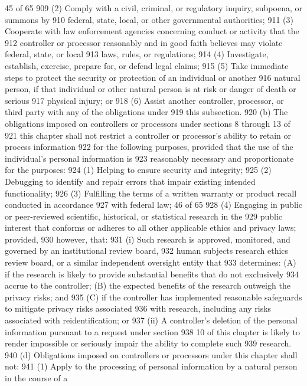 45 of 65
909 (2) Comply with a civil, criminal, or regulatory inquiry, subpoena, or summons by
910 federal, state, local, or other governmental authorities;
911 (3) Cooperate with law enforcement agencies concerning conduct or activity that the
912 controller or processor reasonably and in good faith believes may violate federal, state, or local
913 laws, rules, or regulations;
914 (4) Investigate, establish, exercise, prepare for, or defend legal claims;
915 (5) Take immediate steps to protect the security or protection of an individual or another
916 natural person, if that individual or other natural person is at risk or danger of death or serious
917 physical injury; or
918 (6) Assist another controller, processor, or third party with any of the obligations under
919 this subsection.
920 (b) The obligations imposed on controllers or processors under sections 8 through 13 of
921 this chapter shall not restrict a controller or processor’s ability to retain or process information
922 for the following purposes, provided that the use of the individual’s personal information is
923 reasonably necessary and proportionate for the purposes:
924 (1) Helping to ensure security and integrity;
925 (2) Debugging to identify and repair errors that impair existing intended functionality;
926 (3) Fulfilling the terms of a written warranty or product recall conducted in accordance
927 with federal law;
46 of 65
928 (4) Engaging in public or peer-reviewed scientific, historical, or statistical research in the
929 public interest that conforms or adheres to all other applicable ethics and privacy laws; provided,
930 however, that:
931 (i) Such research is approved, monitored, and governed by an institutional review board,
932 human subjects research ethics review board, or a similar independent oversight entity that
933 determines: (A) if the research is likely to provide substantial benefits that do not exclusively
934 accrue to the controller; (B) the expected benefits of the research outweigh the privacy risks; and
935 (C) if the controller has implemented reasonable safeguards to mitigate privacy risks associated
936 with research, including any risks associated with reidentification; or
937 (ii) A controller’s deletion of the personal information pursuant to a request under section
938 10 of this chapter is likely to render impossible or seriously impair the ability to complete such
939 research.
940 (d) Obligations imposed on controllers or processors under this chapter shall not:
941 (1) Apply to the processing of personal information by a natural person in the course of a
